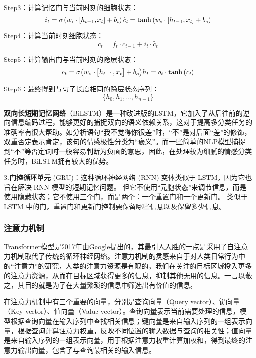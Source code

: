 Step3：计算记忆门与当前时刻的细胞状态：
\begin{equation}i_{t}=\sigma\left(w_{i}\cdot\left[h_{t-1},x_{t}\right]+b_{i}\right)\\\tilde{c}_{t}=\mathrm{tanh}\left(w_{c}\cdot\left[h_{t-1},x_{t}\right]+b_{c}\right)\end{equation}

Step4：计算当前时刻细胞状态：
\begin{equation}c_t=f_t\cdot c_{t-1}+i_t\cdot\tilde{c_t}\end{equation}

Step5：计算输出门与当前时刻的隐层状态：
\begin{equation}o_{t}=\sigma\big(w_{o}\cdot\big[h_{t-1},x_{t}\big]+b_{o}\big)\\h_{t}=o_{t}\cdot\mathrm{tanh}\left(c_{t}\right)\end{equation}

Step6：最终得到与句子长度相同的隐层状态序列：
\begin{equation}\{h_0,h_1,...,h_{n-1}\}\end{equation}

\textbf{双向长短期记忆网络}（BiLSTM）是一种改进版的LSTM，它加入了从后往前的逆向信息编码过程，能够更好的捕捉双向的语义依赖关系，这对于提高多分类任务的准确率有很大帮助。如分析语句“我不觉得你很差”时，“不”是对后面“差”的修饰，双重否定表示肯定，该句的情感极性分类为“褒义”。而一些简单的NLP模型捕捉到“不”等否定词时一般容易判断为负面的意思，因此，在处理较为细腻的情感分类任务时，BiLSTM拥有较大的优势。


3.\textbf{门控循环单元} (GRU)：这种循环神经网络 (RNN) 变体类似于 LSTM，因为它也旨在解决 RNN 模型的短期记忆问题。 但它不使用“元胞状态”来调节信息，而是使用隐藏状态；它不使用三个门，而是两个：一个重置门和一个更新门。 类似于 LSTM 中的门，重置门和更新门控制要保留哪些信息以及保留多少信息。

\subsubsection{注意力机制}
Transformer模型是2017年由Google提出的，其最引人入胜的一点是采用了自注意力机制取代了传统的循环神经网络。注意力机制的灵感来自于对人类日常行为中的“注意力”的研究，人类的注意力资源是有限的，我们在关注的目标区域投入更多的注意力资源，从而在目标区域获得更多的信息，抑制其他无用的信息。一言以蔽之，其目的就是为了在大量繁琐的信息中筛选出有价值的信息。

在注意力机制中有三个重要的向量，分别是查询向量（Query vector）、键向量（Key vector）、值向量（Value vector）。查询向量表示当前需要处理的信息，模型根据查询向量在输入序列中查找相关信息；键向量是来自输入序列的一组表示向量，根据查询计算注意力权重，反映不同位置的输入数据与查询的相关性；值向量是来自输入序列的一组表示向量，用于根据注意力权重计算加权和，得到最终的注意力输出向量，包含了与查询最相关的输入信息。

